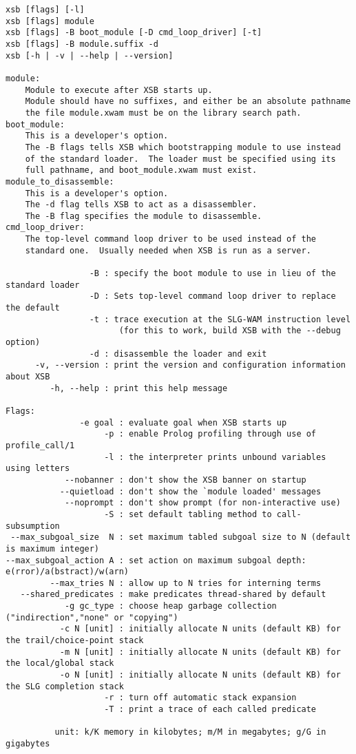 {\small 
\begin{verbatim}
xsb [flags] [-l] 
xsb [flags] module
xsb [flags] -B boot_module [-D cmd_loop_driver] [-t] 
xsb [flags] -B module.suffix -d
xsb [-h | -v | --help | --version]

module:
    Module to execute after XSB starts up.
    Module should have no suffixes, and either be an absolute pathname
    the file module.xwam must be on the library search path.
boot_module:
    This is a developer's option.
    The -B flags tells XSB which bootstrapping module to use instead
    of the standard loader.  The loader must be specified using its
    full pathname, and boot_module.xwam must exist.
module_to_disassemble:
    This is a developer's option.
    The -d flag tells XSB to act as a disassembler.
    The -B flag specifies the module to disassemble.
cmd_loop_driver:
    The top-level command loop driver to be used instead of the
    standard one.  Usually needed when XSB is run as a server.

                 -B : specify the boot module to use in lieu of the standard loader
                 -D : Sets top-level command loop driver to replace the default
                 -t : trace execution at the SLG-WAM instruction level
                       (for this to work, build XSB with the --debug option)
                 -d : disassemble the loader and exit
      -v, --version : print the version and configuration information about XSB
         -h, --help : print this help message

Flags: 
               -e goal : evaluate goal when XSB starts up
                    -p : enable Prolog profiling through use of profile_call/1
                    -l : the interpreter prints unbound variables using letters
            --nobanner : don't show the XSB banner on startup
           --quietload : don't show the `module loaded' messages
            --noprompt : don't show prompt (for non-interactive use)
                    -S : set default tabling method to call-subsumption
 --max_subgoal_size  N : set maximum tabled subgoal size to N (default is maximum integer)
--max_subgoal_action A : set action on maximum subgoal depth: e(rror)/a(bstract)/w(arn)
         --max_tries N : allow up to N tries for interning terms
   --shared_predicates : make predicates thread-shared by default
            -g gc_type : choose heap garbage collection ("indirection","none" or "copying")
           -c N [unit] : initially allocate N units (default KB) for the trail/choice-point stack
           -m N [unit] : initially allocate N units (default KB) for the local/global stack
           -o N [unit] : initially allocate N units (default KB) for the SLG completion stack
                    -r : turn off automatic stack expansion
                    -T : print a trace of each called predicate

          unit: k/K memory in kilobytes; m/M in megabytes; g/G in gigabytes
\end{verbatim}
}

